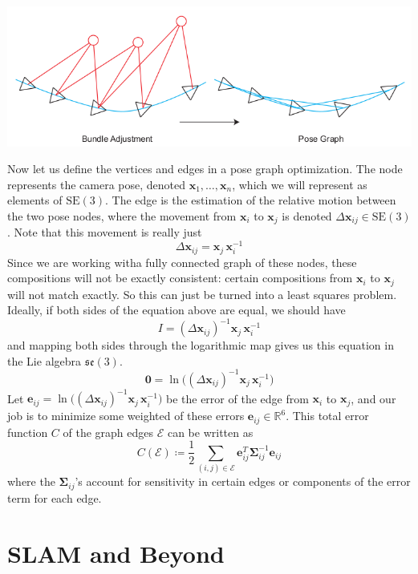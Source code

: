\documentclass{article}
\theoremstyle{definition}
\theoremstyle{remark}
\theoremstyle{definition}
\begin{document}
\begin{center}
    \includegraphics[scale=0.5]{img/pose_optimization.png}
\end{center}

Now let us define the vertices and edges in a pose graph optimization. The node represents the camera pose, denoted $\mathbf{x}_1, \ldots, \mathbf{x}_n$, which we will represent as elements of $\mathrm{SE}(3)$. The edge is the estimation of the relative motion between the two pose nodes, where the movement from $\mathbf{x}_i$ to $\mathbf{x}_j$ is denoted $\Delta \mathbf{x}_{ij} \in \mathrm{SE}(3)$. Note that this movement is really just 
\[\Delta \mathbf{x}_{ij} = \mathbf{x}_{j} \, \mathbf{x}_i^{-1}\]
Since we are working witha fully connected graph of these nodes, these compositions will not be exactly consistent: certain compositions from $\mathbf{x}_i$ to $\mathbf{x}_j$ will not match exactly. So this can just be turned into a least squares problem. Ideally, if both sides of the equation above are equal, we should have 
\[I = (\Delta \mathbf{x}_{ij})^{-1}\mathbf{x}_{j} \, \mathbf{x}_i^{-1}\]
and mapping both sides through the logarithmic map gives us this equation in the Lie algebra $\mathfrak{se}(3)$. 
\[\mathbf{0} = \ln \big(  (\Delta \mathbf{x}_{ij})^{-1}\mathbf{x}_{j} \, \mathbf{x}_i^{-1}\big)\]
Let $\mathbf{e}_{ij} = \ln \big(  (\Delta \mathbf{x}_{ij})^{-1}\mathbf{x}_{j} \, \mathbf{x}_i^{-1}\big)$ be the error of the edge from $\mathbf{x}_i$ to $\mathbf{x}_j$, and our job is to minimize some weighted of these errors $\mathbf{e}_{ij} \in \mathbb{R}^6$. This total error function $C$ of the graph edges $\mathcal{E}$ can be written as 
\[C(\mathcal{E}) \coloneqq \frac{1}{2} \sum_{(i, j) \in \mathcal{E}} \mathbf{e}_{ij}^T \boldsymbol{\Sigma}_{ij}^{-1} \mathbf{e}_{ij}\]
where the $\boldsymbol{\Sigma}_{ij}$'s account for sensitivity in certain edges or components of the error term for each edge. 

\section{SLAM and Beyond}
\end{document}
